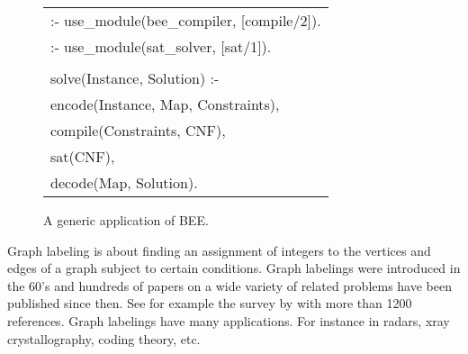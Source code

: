 \documentclass{tlp}
\newenvironment{SProg}
     {\begin{small}\begin{tt}\begin{tabular}[c]{l}}{\end{tabular}\end{tt}\end{small}}
\newcommand{\bee}{\textsf{BEE}}
\begin{document}
\begin{figure}[t]
\begin{SProg}
    :- use\_module(bee\_compiler, [compile/2]).  \\
    :- use\_module(sat\_solver, [sat/1]).  \\
\vspace{-3mm}\\ 
    solve(Instance, Solution) :- \\
    \qquad    encode(Instance, Map, Constraints),\\
    \qquad    compile(Constraints, CNF), \\
    \qquad    sat(CNF), \\
    \qquad    decode(Map, Solution).\\
  \end{SProg}
  \caption{A generic application of \bee.}
\label{fig:generic}
\end{figure}


Graph labeling is about finding an assignment of integers to the
vertices and edges of a graph subject to certain conditions.  Graph
labelings were introduced in the 60's and hundreds of papers on a wide
variety of related problems have been published since then. See for
example the survey by  with more than 1200
references. Graph labelings have many applications. For instance in
radars, xray crystallography, coding theory, etc.
\end{document}
